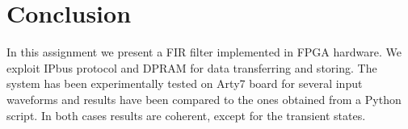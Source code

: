 \documentclass[11pt, a4paper]{article}
\begin{document}
\section{Conclusion}
In this assignment we present a FIR filter implemented in FPGA hardware. We exploit IPbus protocol and DPRAM for data transferring and storing. 
The system has been experimentally tested on Arty7 board for several input waveforms and results have been compared to the ones obtained from a Python script. In both cases results are coherent, except for the transient states.
\end{document}
